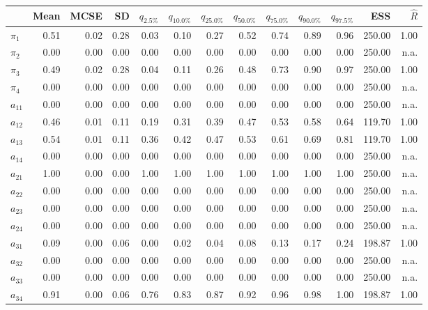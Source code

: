 \documentclass[]{article}
\begin{document}
\begin{table}[ht]
\centering
\begingroup\footnotesize
\begin{tabularx}{\textwidth}{lRRRRRRRRRRRR}
  \toprule
 & Mean & MCSE & SD & $q_{2.5\%}$ & $q_{10.0\%}$ & $q_{25.0\%}$ & $q_{50.0\%}$ & $q_{75.0\%}$ & $q_{90.0\%}$ & $q_{97.5\%}$ & ESS & $\hat{R}$ \\ 
  \midrule
$\pi_{1}$ & 0.51 & 0.02 & 0.28 & 0.03 & 0.10 & 0.27 & 0.52 & 0.74 & 0.89 & 0.96 & 250.00 & 1.00 \\ 
  $\pi_{2}$ & 0.00 & 0.00 & 0.00 & 0.00 & 0.00 & 0.00 & 0.00 & 0.00 & 0.00 & 0.00 & 250.00 & n.a. \\ 
  $\pi_{3}$ & 0.49 & 0.02 & 0.28 & 0.04 & 0.11 & 0.26 & 0.48 & 0.73 & 0.90 & 0.97 & 250.00 & 1.00 \\ 
  $\pi_{4}$ & 0.00 & 0.00 & 0.00 & 0.00 & 0.00 & 0.00 & 0.00 & 0.00 & 0.00 & 0.00 & 250.00 & n.a. \\ 
   \midrule
$a_{11}$ & 0.00 & 0.00 & 0.00 & 0.00 & 0.00 & 0.00 & 0.00 & 0.00 & 0.00 & 0.00 & 250.00 & n.a. \\ 
  $a_{12}$ & 0.46 & 0.01 & 0.11 & 0.19 & 0.31 & 0.39 & 0.47 & 0.53 & 0.58 & 0.64 & 119.70 & 1.00 \\ 
  $a_{13}$ & 0.54 & 0.01 & 0.11 & 0.36 & 0.42 & 0.47 & 0.53 & 0.61 & 0.69 & 0.81 & 119.70 & 1.00 \\ 
  $a_{14}$ & 0.00 & 0.00 & 0.00 & 0.00 & 0.00 & 0.00 & 0.00 & 0.00 & 0.00 & 0.00 & 250.00 & n.a. \\ 
  $a_{21}$ & 1.00 & 0.00 & 0.00 & 1.00 & 1.00 & 1.00 & 1.00 & 1.00 & 1.00 & 1.00 & 250.00 & n.a. \\ 
  $a_{22}$ & 0.00 & 0.00 & 0.00 & 0.00 & 0.00 & 0.00 & 0.00 & 0.00 & 0.00 & 0.00 & 250.00 & n.a. \\ 
  $a_{23}$ & 0.00 & 0.00 & 0.00 & 0.00 & 0.00 & 0.00 & 0.00 & 0.00 & 0.00 & 0.00 & 250.00 & n.a. \\ 
  $a_{24}$ & 0.00 & 0.00 & 0.00 & 0.00 & 0.00 & 0.00 & 0.00 & 0.00 & 0.00 & 0.00 & 250.00 & n.a. \\ 
  $a_{31}$ & 0.09 & 0.00 & 0.06 & 0.00 & 0.02 & 0.04 & 0.08 & 0.13 & 0.17 & 0.24 & 198.87 & 1.00 \\ 
  $a_{32}$ & 0.00 & 0.00 & 0.00 & 0.00 & 0.00 & 0.00 & 0.00 & 0.00 & 0.00 & 0.00 & 250.00 & n.a. \\ 
  $a_{33}$ & 0.00 & 0.00 & 0.00 & 0.00 & 0.00 & 0.00 & 0.00 & 0.00 & 0.00 & 0.00 & 250.00 & n.a. \\ 
  $a_{34}$ & 0.91 & 0.00 & 0.06 & 0.76 & 0.83 & 0.87 & 0.92 & 0.96 & 0.98 & 1.00 & 198.87 & 1.00 \\ 

\end{tabularx}
\end{table}
\end{document}
